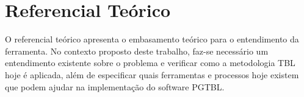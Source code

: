 \chapter[Referencial Teórico]{Referencial Teórico}

O referencial teórico apresenta o embasamento teórico para o entendimento da ferramenta. No contexto proposto deste trabalho, faz-se necessário um entendimento existente sobre o problema e verificar como a metodologia TBL hoje é aplicada, além de especificar quais ferramentas e processos hoje existem que podem ajudar na implementação do software PGTBL.
